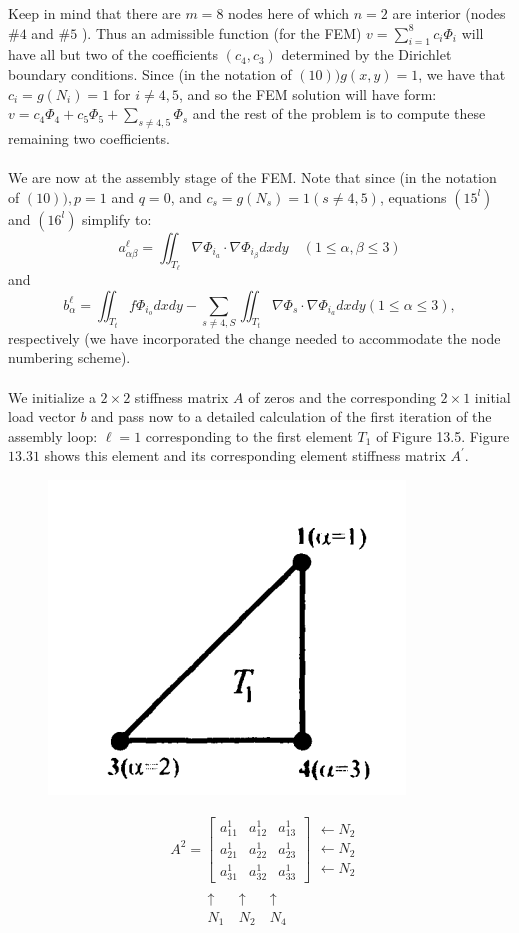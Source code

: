 \documentclass[../main.tex]{subfiles}
\begin{document}
Keep in mind that there are $m=8$ nodes here of which $n=2$ are interior (nodes $\# 4$ and $\# 5$ ). Thus an admissible function (for the FEM) $v=\sum_{i=1}^{8} c_{i} \Phi_{i}$ will have all but two of the coefficients $\left(c_{4}, c_{3}\right)$ determined by the Dirichlet boundary conditions. Since (in the notation of $(10)) g(x, y)=1$, we have that $c_{i}=g\left(N_{i}\right)=1$ for $i \neq 4,5$, and so the FEM solution will have form: $v=c_{4} \Phi_{4}+c_{5} \Phi_{5}+\sum_{s \neq 4,5} \Phi_{s}$ and the rest of the problem is to compute these remaining two coefficients.
\\
\\
We are now at the assembly stage of the FEM. Note that since (in the notation of $(10)), p=1$ and $q=0$, and $c_{s}=g\left(N_{s}\right)=1(s \neq 4,5)$, equations $\left(15^{l}\right)$ and $\left(16^{l}\right)$ simplify to:
$$
a_{\alpha \beta}^{\ell}=\iint_{T_{\ell}} \nabla \Phi_{i_{a}} \cdot \nabla \Phi_{i_{\beta}} d x d y \quad(1 \leq \alpha, \beta \leq 3)
$$
and
$$
b_{\alpha}^{\ell}=\iint_{T_{t}} f \Phi_{i_{o}} d x d y-\sum_{s \neq 4, S} \iint_{T_{t}} \nabla \Phi_{s} \cdot \nabla \Phi_{i_{a}} d x d y(1 \leq \alpha \leq 3),
$$
respectively (we have incorporated the change needed to accommodate the node numbering scheme).
\\
\\
We initialize a $2 \times 2$ stiffness matrix $A$ of zeros and the corresponding $2 \times 1$ initial load vector $b$ and pass now to a detailed calculation of the first iteration of the assembly loop: $\ell=1$ corresponding to the first element $T_{1}$ of Figure 13.5. Figure $13.31$ shows this element and its corresponding element stiffness matrix $A^{\prime}$.
\begin{figure}[H]
\includegraphics[width=0.3\linewidth]{16}
	\centering
	\label{pfig:ch13_8}
\end{figure}
$$
\begin{aligned}
&A^{2}=\left[\begin{array}{lll}
a_{11}^{1} & a_{12}^{1} & a_{13}^{1} \\
a_{21}^{1} & a_{22}^{1} & a_{23}^{1} \\
a_{31}^{1} & a_{32}^{1} & a_{33}^{1}
\end{array}\right] \begin{array}{lll}
\leftarrow N_{2}\\
\leftarrow N_{2}\\
\leftarrow N_{2}
\end{array}
\\
&\begin{array}{ccccc}
~&~&~\uparrow &~\uparrow &~\uparrow\\
~&~&~N_{1}&~N_{2}&~N_{4}
\end{array}
\end{aligned}
$$
\end{document}

